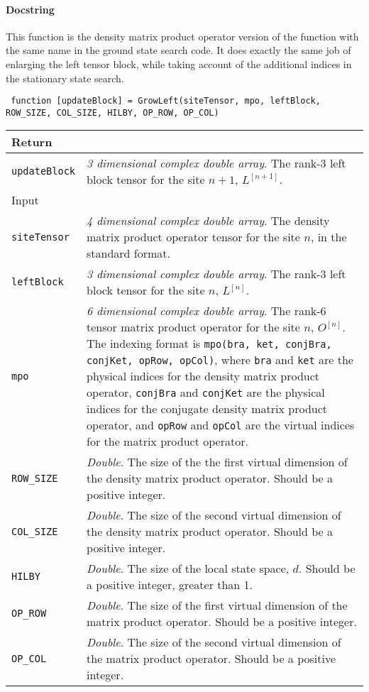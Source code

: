  \paragraph{Docstring} This function is the density matrix product operator version of the function with the same name in the ground state search code. It does exactly the same job of enlarging the left tensor block, while taking account of the additional indices in the stationary state search.
 \begin{lstlisting}
 function [updateBlock] = GrowLeft(siteTensor, mpo, leftBlock, ROW_SIZE, COL_SIZE, HILBY, OP_ROW, OP_COL) \end{lstlisting}
 \begin{longtabu}{X[1,l]X[4,l]}
 \hline
 Return & \\ \hline
 \lstinline$updateBlock$ & \emph{3 dimensional complex double array}. The rank-3 left block tensor for the site \(n + 1\), \(L^{[n+1]}\). \\ \hline
 Input & \\ \hline
 \lstinline$siteTensor$ & \emph{4 dimensional complex double array}. The density matrix product operator tensor for the site \(n\), in the standard format. \\
 \lstinline$leftBlock$ & \emph{3 dimensional complex double array}. The rank-3 left block tensor for the site \(n\), \(L^{[n]}\). \\
 \lstinline$mpo$ & \emph{6 dimensional complex double array}. The rank-6 tensor matrix product operator for the site \(n\), \(O^{[n]}\). The indexing format is \lstinline$mpo(bra, ket, conjBra, conjKet, opRow, opCol)$, where \lstinline$bra$ and \lstinline$ket$ are the physical indices for the density matrix product operator, \lstinline$conjBra$ and \lstinline$conjKet$ are the physical indices for the conjugate density matrix product operator, and \lstinline$opRow$ and \lstinline$opCol$ are the virtual indices for the matrix product operator. \\
 \lstinline$ROW_SIZE$ & \emph{Double}. The size of the the first virtual dimension of the density matrix product operator. Should be a positive integer. \\
 \lstinline$COL_SIZE$ & \emph{Double}. The size of the second virtual dimension of the density matrix product operator. Should be a positive integer. \\ 
 \lstinline$HILBY$ & \emph{Double}. The size of the local state space, \(d\). Should be a positive integer, greater than 1. \\
 \lstinline$OP_ROW$ & \emph{Double}. The size of the first virtual dimension of the matrix product operator. Should be a positive integer. \\
 \lstinline$OP_COL$ & \emph{Double}. The size of the second virtual dimension of the matrix product operator. Should be a positive integer. \\
 \hline
 \end{longtabu}

